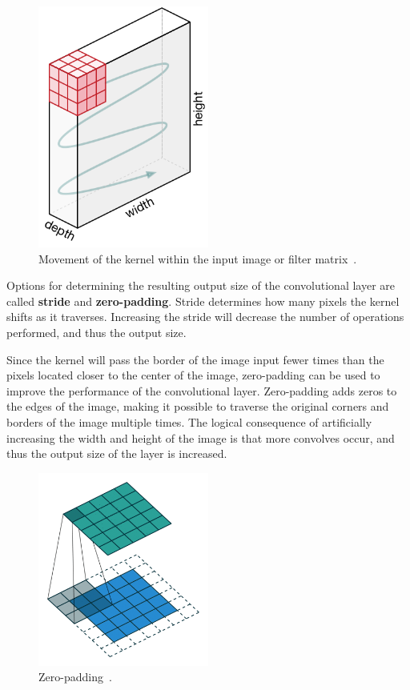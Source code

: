 \documentclass[english, bibtex]{kththesis}
\begin{document}
\begin{figure}[H]
  \begin{center}
    \includegraphics[width=0.5\textwidth]{figures/kernel_movement.png}
  \end{center}
  \caption{Movement of the kernel within the input image or filter matrix~\cite{Kang2020DeepCN}.}
  \label{fig:kernelmovement}
\end{figure}


Options for determining the resulting output size of the convolutional layer are called \textbf{stride} and \textbf{zero-padding}. Stride determines how many pixels the kernel shifts as it traverses. Increasing the stride will decrease the number of operations performed, and thus the output size. 

Since the kernel will pass the border of the image input fewer times than the pixels located closer to the center of the image, zero-padding can be used to improve the performance of the convolutional layer. Zero-padding adds zeros to the edges of the image, making it possible to traverse the original corners and borders of the image multiple times. The logical consequence of artificially increasing the width and height of the image is that more convolves occur, and thus the output size of the layer is increased. 

\begin{figure}[H]
  \begin{center}
    \includegraphics[width=0.5\textwidth]{figures/padding.png}
  \end{center}
  \caption{Zero-padding~\cite{Kang2020DeepCN}.}
  \label{fig:padding}
\end{figure}
\end{document}
